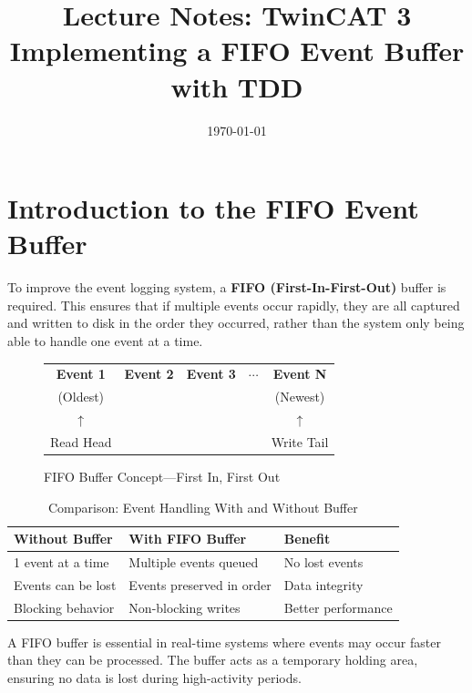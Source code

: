 \documentclass[11pt,a4paper]{article}
\title{
    \vspace{-1cm}
    \textbf{Lecture Notes: TwinCAT 3}\\
    \Large Implementing a FIFO Event Buffer with TDD
}
\author{}
\date{\today}
\begin{document}
\maketitle

\tableofcontents
\newpage

\section{Introduction to the FIFO Event Buffer}

To improve the event logging system, a \textbf{FIFO (First-In-First-Out)} buffer is required. This ensures that if multiple events occur rapidly, they are all captured and written to disk in the order they occurred, rather than the system only being able to handle one event at a time.

\begin{figure}[h]
\centering
\begin{tabular}{|c|c|c|c|c|}
\hline
\textbf{Event 1} & \textbf{Event 2} & \textbf{Event 3} & $\cdots$ & \textbf{Event N} \\
(Oldest) & & & & (Newest) \\
\hline
$\uparrow$ & & & & $\uparrow$ \\
Read Head & & & & Write Tail \\
\hline
\end{tabular}
\caption{FIFO Buffer Concept---First In, First Out}
\end{figure}

\begin{table}[h]
\centering
\begin{tabular}{@{}lll@{}}
\toprule
\textbf{Without Buffer} & \textbf{With FIFO Buffer} & \textbf{Benefit} \\
\midrule
1 event at a time & Multiple events queued & No lost events \\
Events can be lost & Events preserved in order & Data integrity \\
Blocking behavior & Non-blocking writes & Better performance \\
\bottomrule
\end{tabular}
\caption{Comparison: Event Handling With and Without Buffer}
\end{table}

\begin{notebox}
A FIFO buffer is essential in real-time systems where events may occur faster than they can be processed. The buffer acts as a temporary holding area, ensuring no data is lost during high-activity periods.
\end{notebox}
\end{document}
